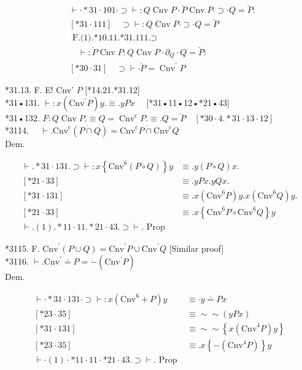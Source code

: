 \documentclass[10pt]{article}
\begin{document}
\begin{align*}
& \vdash \cdot * 31 \cdot 101 \cdot \supset \vdash: Q \operatorname{Cnv} P \cdot \breve{P} \operatorname{Cnv} P \cdot \supset \cdot Q=\breve{P}: \\
& {[* 31 \cdot 111] \quad \supset \vdash: Q \operatorname{Cnv} P \cdot \supset \cdot Q=\breve{P}}  \tag{1}\\
& \text { F.(1).*10.11.*31.111.} \supset \\
& \quad \vdash: \breve{P} \operatorname{Cnv} P: Q \operatorname{Cnv} P \cdot \partial_{Q} \cdot Q=\breve{P}: \\
& {[* 30 \cdot 31] \quad \supset \vdash \cdot \breve{P}=\operatorname{Cnv}^{\prime} P}
\end{align*}


*31.13. F. E! Cnv' $P$ [*14.21.*31.12]\\
*31•131. $\vdash: x\left(\mathrm{Cnv}^{\prime} P\right) y . \equiv . y P x \quad$ [*31•11•12•*21•43]\\
*31•132. $F: Q \operatorname{Cnv} P . \equiv Q=\operatorname{Cnv}^{\mathrm{c}} P . \equiv . Q=\breve{P} \quad[* 30 \cdot 4 . * 31 \cdot 13 \cdot 12]$\\
*3114. $\quad \vdash . \mathrm{Cnv}^{\mathrm{c}}(P \dot{\cap} Q)=\mathrm{Cnv}^{\mathrm{c}} P \dot{\cap} \mathrm{Cnv}^{\mathrm{c}} Q$\\
Dem.

\[
\begin{array}{ll}
\vdash . * 31 \cdot 131 . \supset \vdash: x\left\{\mathrm{Cnv}^{6}(P \dot{\circ} Q)\right\} y & \equiv . y(P \dot{\circ} Q) x . \\
{[* 21 \cdot 33]} & \equiv . y P x . y Q x . \\
{[* 31 \cdot 131]} & \equiv . x\left(\mathrm{Cnv}^{6} P\right) y . x\left(\mathrm{Cnv}^{6} Q\right) y . \\
{[* 21 \cdot 33]} & \equiv . x\left\{\mathrm{Cnv}^{6} P \dot{\circ} \mathrm{Cnv}^{6} Q\right\} y  \tag{1}\\
\vdash .(1) . * 11 \cdot 11 . * 21 \cdot 43 . \supset \vdash . \text { Prop } &
\end{array}
\]

*3115. F. $\mathrm{Cnv}^{\prime}(P \cup Q)=\mathrm{Cnv}^{\prime} P \cup \mathrm{Cnv}^{\prime} Q$ [Similar proof]\\
*3116. $\vdash . \mathrm{Cnv}^{\prime} \doteq P=\dot{-}\left(\mathrm{Cnv}^{\prime} P\right)$\\
Dem.

\[
\begin{array}{ll}
\vdash \cdot * 31 \cdot 131 \cdot \supset \vdash: x\left(\mathrm{Cnv}^{6}+P\right) y & \equiv \cdot y \doteq P x \\
{[* 23 \cdot 35]} & \equiv \sim \sim(y P x) \\
{[* 31 \cdot 131]} & \equiv \sim \sim\left\{x\left(\mathrm{Cnv}^{4} P\right) y\right\} \\
{[* 23 \cdot 35]} & \equiv . x\left\{-\left(\mathrm{Cnv}^{4} P\right)\right\} y  \tag{1}\\
\vdash \cdot(1) \cdot * 11 \cdot 11 \cdot * 21 \cdot 43 . \supset \vdash . \text { Prop }
\end{array}
\]
\end{document}
